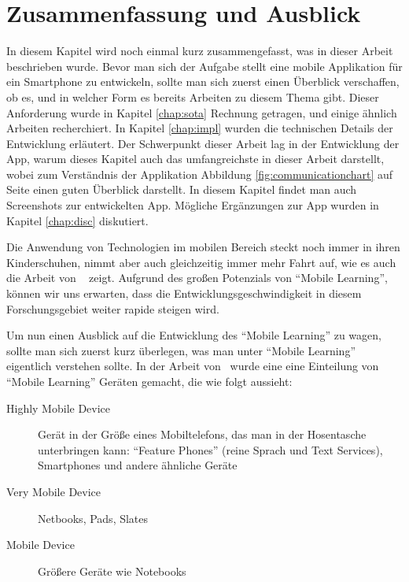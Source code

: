 
\chapter{Zusammenfassung und Ausblick}
\label{chap:concl}

In diesem Kapitel wird noch einmal kurz zusammengefasst, was in dieser Arbeit beschrieben wurde.
Bevor man sich der Aufgabe stellt eine mobile Applikation für ein Smartphone zu entwickeln, sollte
man sich zuerst einen Überblick verschaffen, ob es, und in welcher Form es bereits Arbeiten zu 
diesem Thema gibt. Dieser Anforderung wurde in Kapitel \ref{chap:sota} Rechnung getragen, und einige
ähnlich Arbeiten recherchiert.
In Kapitel \ref{chap:impl} wurden die technischen Details der Entwicklung erläutert. 
Der Schwerpunkt dieser Arbeit lag in der Entwicklung der App, warum dieses Kapitel auch das umfangreichste
in dieser Arbeit darstellt, wobei zum Verständnis der Applikation Abbildung \ref{fig:communicationchart}
auf Seite \pageref{fig:communicationchart} einen guten Überblick darstellt. In diesem Kapitel findet
man auch Screenshots zur entwickelten App.
Mögliche Ergänzungen zur App wurden in Kapitel \ref{chap:disc} diskutiert.


Die Anwendung von Technologien im mobilen Bereich steckt noch immer in ihren Kinderschuhen, 
nimmt aber auch gleichzeitig immer mehr Fahrt auf, wie es auch die Arbeit von ~\cite{Ebner2013} zeigt. 
Aufgrund des großen Potenzials von \enquote{Mobile Learning}, können wir uns erwarten, 
dass die Entwicklungsgeschwindigkeit in diesem Forschungsgebiet weiter rapide steigen wird.

Um nun einen Ausblick auf die Entwicklung des \enquote{Mobile Learning} zu wagen, sollte 
man sich zuerst kurz überlegen, was man unter \enquote{Mobile Learning} eigentlich
verstehen sollte. In der Arbeit von~\cite{Brown2010} wurde eine eine Einteilung von \enquote{Mobile Learning}
Geräten gemacht, die wie folgt aussieht: 
\begin{description}
	\item[Highly Mobile Device] Gerät in der Größe eines Mobiltelefons, das man in der Hosentasche
	unterbringen kann: \enquote{Feature Phones} (reine Sprach und Text Services), Smartphones und andere ähnliche Geräte
	\item[Very Mobile Device] Netbooks, Pads, Slates
	\item[Mobile Device] Größere Geräte wie Notebooks
\end{description}

